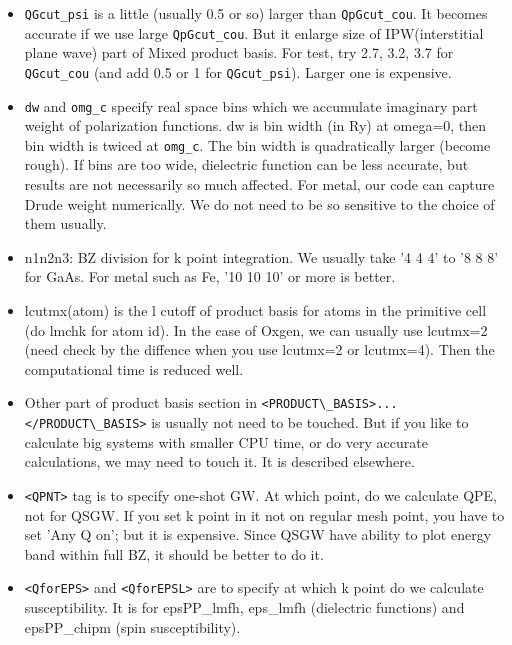 \documentclass[a4paper,10pt,epsf,fleqn]{article}
\begin{document}
\begin{itemize}
\item
     \verb+QGcut_psi+ is a little (usually 0.5 or so) larger than \verb+QpGcut_cou+.
     It becomes accurate if we use large \verb+QpGcut_cou+. 
     But it enlarge size of IPW(interstitial plane wave) part of Mixed
     product basis. For test, try  2.7, 3.2, 3.7 for \verb+QGcut_cou+
     (and add 0.5 or 1 for \verb+QGcut_psi+). Larger one is expensive.
\item
     \verb+dw+ and \verb+omg_c+ specify real space bins which we accumulate imaginary part
     weight of polarization functions. dw is bin width (in Ry) at
     omega=0, then bin width is twiced at \verb+omg_c+.
     The bin width is quadratically larger (become rough). 
     If bins are too wide, dielectric function can be less accurate, 
     but results are not necessarily so much affected. 
     For metal, our code can capture Drude weight
     numerically. We do not need to be so sensitive to the choice of
     them usually.
\item
  n1n2n3: BZ division for k point integration. 
     We usually take '4 4 4' to '8 8 8' for GaAs. For metal such
     as Fe, '10 10 10' or more is better.
\item
     lcutmx(atom) is the l cutoff of product basis for atoms 
     in the primitive cell (do lmchk for atom id).
     In the case of Oxgen, we can usually use lcutmx=2 (need check by
     the diffence when you use lcutmx=2 or lcutmx=4). 
     Then the computational time is reduced well.
\item
     Other part of product basis section in \verb+<PRODUCT\_BASIS>... </PRODUCT\_BASIS>+
     is usually not need to be touched. But if you
     like to calculate big systems with smaller CPU time,
     or do very accurate calculations, we may need to touch it.  
     It is described elsewhere.
\item
    \verb+<QPNT>+ tag is to specify one-shot GW. At which point, do we
    calculate QPE, not for QSGW. If you set k point in it not on regular mesh point,
    you have to set 'Any Q on'; but it is expensive.
    Since QSGW have ability to plot energy band within full BZ,
    it should be better to do it.
\item
   \verb+<QforEPS>+ and \verb+<QforEPSL>+ are to specify at which k point do we
   calculate susceptibility. It is for epsPP\_lmfh, eps\_lmfh
   (dielectric functions) and epsPP\_chipm (spin susceptibility).
\end{itemize}
\end{document}
